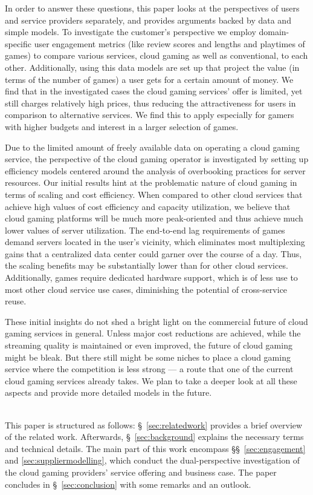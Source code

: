 In order to answer these questions, this paper looks at the perspectives of users and service providers separately, and provides arguments backed by data and simple models. To investigate the customer's perspective we employ domain-specific user engagement metrics (like review scores and lengths and playtimes of games) to compare various services, cloud gaming as well as conventional, to each other. Additionally, using this data models are set up that project the value (in terms of the number of games) a user gets for a certain amount of money. We find that in the investigated cases the cloud gaming services' offer is limited, yet still charges relatively high prices, thus reducing the attractiveness for users in comparison to alternative services. We find this to apply especially for gamers with higher budgets and interest in a larger selection of games.

Due to the limited amount of freely available data on operating a cloud gaming service, the perspective of the cloud gaming operator is investigated by setting up efficiency models centered around the analysis of overbooking practices for server resources. Our initial results hint at the problematic nature of cloud gaming in terms of scaling and cost efficiency. When compared to other cloud services that achieve high values of cost efficiency and capacity utilization, we believe that cloud gaming platforms will be much more peak-oriented and thus achieve much lower values of server utilization. The end-to-end lag requirements of games demand servers located in the user's vicinity, which eliminates most multiplexing gains that a centralized data center could garner over the course of a day. Thus, the scaling benefits may be substantially lower than for other cloud services. Additionally, games require dedicated hardware support, which is of less use to most other cloud service use cases, diminishing the potential of cross-service reuse.

These initial insights do not shed a bright light on the commercial future of cloud gaming services in general. Unless major cost reductions are achieved, while the streaming quality is maintained or even improved, the future of cloud gaming might be bleak. But there still might be some niches to place a cloud gaming service where the competition is less strong --- a route that one of the current cloud gaming services already takes. We plan to take a deeper look at all these aspects and provide more detailed models in the future.

~\\
This paper is structured as follows: §~\ref{sec:relatedwork} provides a brief overview of the related work. Afterwards, §~\ref{sec:background} explains the necessary terms and technical details. The main part of this work encompass §§~\ref{sec:engagement} and \ref{sec:suppliermodelling}, which conduct the dual-perspective investigation of the cloud gaming providers' service offering and business case. The paper concludes in §~\ref{sec:conclusion} with some remarks and an outlook.
